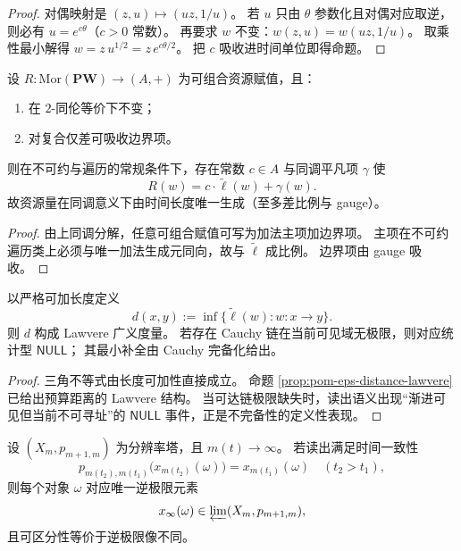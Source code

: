 \begin{proof}
对偶映射是 \((z,u)\mapsto(uz,1/u)\)。
若 \(u\) 只由 \(\theta\) 参数化且对偶对应取逆，则必有 \(u=e^{c\theta}\)（\(c>0\) 常数）。
再要求 \(w\) 不变：\(w(z,u)=w(uz,1/u)\)。
取乘性最小解得 \(w=z\,u^{1/2}=z\,e^{c\theta/2}\)。
把 \(c\) 吸收进时间单位即得命题。
\end{proof}

\begin{theorem}\label{thm:xi-time-initial-generator-for-resources}
设 \(R:\mathrm{Mor}(\mathbf{PW})\to (A,+)\) 为可组合资源赋值，且：
\begin{enumerate}
  \item 在 \(2\)-同伦等价下不变；
  \item 对复合仅差可吸收边界项。
\end{enumerate}
则在不可约与遍历的常规条件下，存在常数 \(c\in A\) 与同调平凡项 \(\gamma\) 使
\[
R(w)=c\cdot\widetilde\ell(w)+\gamma(w).
\]
故资源量在同调意义下由时间长度唯一生成（至多差比例与 gauge）。
\end{theorem}

\begin{proof}
由上同调分解，任意可组合赋值可写为加法主项加边界项。
主项在不可约遍历类上必须与唯一加法生成元同向，故与 \(\widetilde\ell\) 成比例。
边界项由 gauge 吸收。
\end{proof}

\begin{proposition}\label{prop:xi-time-lawvere-null-incompleteness}
以严格可加长度定义
\[
d(x,y):=\inf\{\widetilde\ell(w):w:x\to y\}.
\]
则 \(d\) 构成 Lawvere 广义度量。
若存在 Cauchy 链在当前可见域无极限，则对应统计型 \(\mathsf{NULL}\)；
其最小补全由 Cauchy 完备化给出。
\end{proposition}

\begin{proof}
三角不等式由长度可加性直接成立。
命题 \ref{prop:pom-eps-distance-lawvere} 已给出预算距离的 Lawvere 结构。
当可达链极限缺失时，读出语义出现“渐进可见但当前不可寻址”的 \(\mathsf{NULL}\) 事件，正是不完备性的定义性表现。
\end{proof}

\begin{theorem}\label{thm:xi-time-consistent-inverse-limit-readout}
设 \((X_m,p_{m+1,m})\) 为分辨率塔，且 \(m(t)\to\infty\)。
若读出满足时间一致性
\[
p_{m(t_2),m(t_1)}\bigl(x_{m(t_2)}(\omega)\bigr)=x_{m(t_1)}(\omega)\quad(t_2>t_1),
\]
则每个对象 \(\omega\) 对应唯一逆极限元素
\[
x_\infty(\omega)\in \varprojlim(X_m,p_{m+1,m}),
\]
且可区分性等价于逆极限像不同。
\end{theorem}

